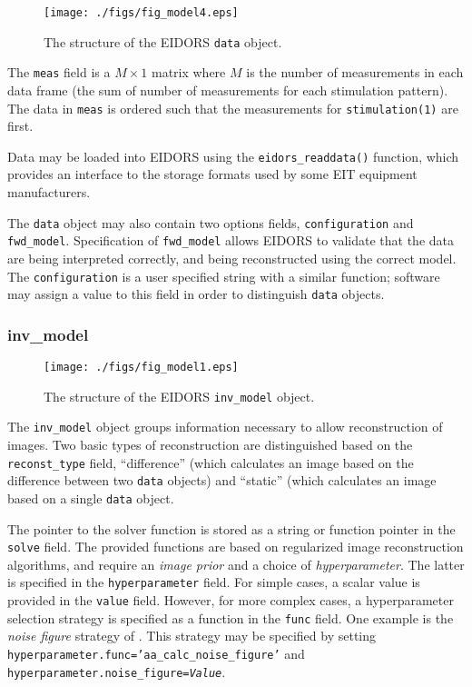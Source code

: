 \documentclass[12pt]{iopart}
\begin{document}
%
%
\begin{figure}[th]
\begin{flushright}
\texttt{[image: ./figs/fig\_model4.eps]}
\caption{\small The structure of the EIDORS {\tt data} object.
\label{fig:data}
 }
\end{flushright}
\end{figure}


The {\tt meas} field is a $M\times1$ matrix where
$M$ is the number of measurements in each data frame
(the sum of number of measurements for each stimulation
pattern). The data in {\tt meas} is ordered such that
the measurements for {\tt stimulation(1)} are first.

Data may be loaded into EIDORS using the {\tt eidors\_readdata()}
function, which provides an interface to the storage
formats used by some EIT equipment manufacturers.

The {\tt data} object may also contain two options fields,
{\tt configuration} and {\tt fwd\_model}. Specification
of {\tt fwd\_model} allows EIDORS to validate that the
data are being interpreted correctly, and being reconstructed
using the correct model. The {\tt configuration} is
a user specified string with a similar function; software
may assign a value to this field in order to distinguish
{\tt data} objects.


\subsubsection{inv\_model}

%
%
\begin{figure}[th]
\begin{flushright}
\texttt{[image: ./figs/fig\_model1.eps]}
\caption{\small The structure of the EIDORS {\tt inv\_model} object.
\label{fig:inv_model}
 }
\end{flushright}
\end{figure}

The {\tt inv\_model} object groups information necessary to 
allow reconstruction of images. Two basic types of reconstruction
are distinguished based on the {\tt reconst\_type} field, 
``difference'' (which calculates an image based on the difference
between two {\tt data} objects) and ``static'' (which calculates an
image based on a single {\tt data} object.

The pointer to the solver function is stored as a string or function
pointer in the {\tt solve} field. The provided functions are based
on regularized image reconstruction algorithms, and require 
an {\em image prior} and a choice of {\em hyperparameter}. 
The latter is specified in the {\tt hyperparameter} field. For
simple cases, a scalar value is provided in the {\tt value} field.
However, for more complex cases, a hyperparameter selection strategy
is specified as a function in the {\tt func} field. One example
is the {\em noise figure} strategy of \cite{Adler_and_Guardo_1996}.
This strategy may be specified by setting
 {\tt hyperparameter.func='aa\_calc\_noise\_figure'}
and 
 {\tt hyperparameter.noise\_figure=\em Value}.
\end{document}
